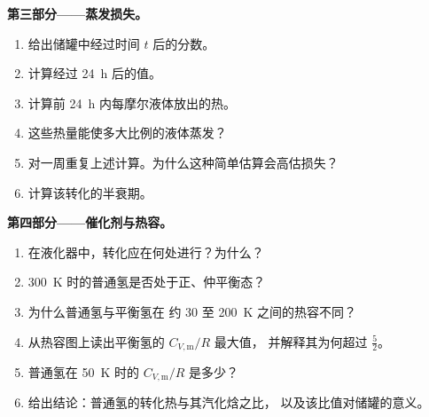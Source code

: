 \begin{problem}
\medskip\noindent\textbf{第三部分——蒸发损失。}
\begin{enumerate}[resume]
  \item 给出储罐中经过时间 $t$ 后的分数。
  \item 计算经过 \qty{24}{h} 后的值。
  \item 计算前 \qty{24}{h} 内每摩尔液体放出的热。
  \item 这些热量能使多大比例的液体蒸发？
  \item 对一周重复上述计算。为什么这种简单估算会高估损失？
  \item 计算该转化的半衰期。
\end{enumerate}

\medskip\noindent\textbf{第四部分——催化剂与热容。}
\begin{enumerate}[resume]
  \item 在液化器中，转化应在何处进行？为什么？
  \item \qty{300}{K} 时的普通氢是否处于正、仲平衡态？
  \item 为什么普通氢与平衡氢在
        约 30 至 \qty{200}{K} 之间的热容不同？
  \item 从热容图上读出平衡氢的 $C_{V,\mathrm m}/R$ 最大值，
        并解释其为何超过 $\frac52$。
  \item 普通氢在 \qty{50}{K} 时的 $C_{V,\mathrm m}/R$ 是多少？
  \item 给出结论：普通氢的转化热与其汽化焓之比，
        以及该比值对储罐的意义。
\end{enumerate}
\end{problem}

